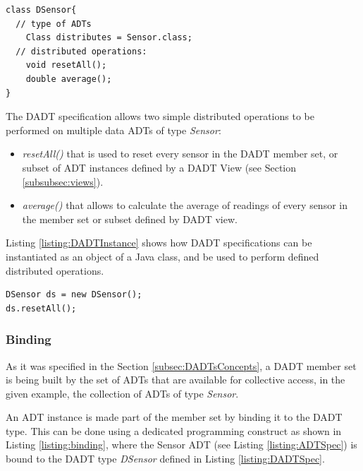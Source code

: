 \begin{lstlisting}[frame=trbl, basewidth={0.55em, 0.6em}, captionpos=b, 
basicstyle=\ttfamily\footnotesize, breaklines, caption = Data DADT 
specification (reproduced from \cite{migliavacca_DADT:2006}), label = 
listing:DADTSpec]
class DSensor{
  // type of ADTs
    Class distributes = Sensor.class;	
  // distributed operations:
	void resetAll();
	double average();
}
\end{lstlisting} 
 
The DADT specification allows two simple distributed operations to be performed
on multiple data ADTs of type \emph{Sensor}:  
\begin{itemize}
\item \emph{resetAll()} that is used to reset every sensor in the DADT member
set, or subset of ADT instances defined by a DADT View (see Section
\ref{subsubsec:views}).
\item \emph{average()} that allows to calculate the average of readings of every
sensor in the member set or subset defined by DADT view.
\end{itemize}

Listing \ref{listing:DADTInstance} shows how DADT specifications can be
instantiated as an object of a Java class, and be used to perform defined
distributed operations.

\begin{lstlisting}[frame=trbl, basewidth={0.55em, 0.6em}, captionpos=b, 
basicstyle=\ttfamily\footnotesize, breaklines, caption = DADT Instantiation 
(adapted from \cite{migliavacca_DADT:2006}), label = listing:DADTInstance ]
DSensor ds = new DSensor();
ds.resetAll();
\end{lstlisting}

\subsubsection{Binding}

As it was specified in the Section \ref{subsec:DADTsConcepts}, a DADT member set
 is being built by the set of ADTs that are available for collective
access, in the given example, the collection of ADTs of type \emph{Sensor}.

An ADT instance is made part of the member set by binding it to the DADT type.
This can be done using a dedicated programming construct as shown in Listing
\ref{listing:binding}, where the Sensor ADT (see Listing \ref{listing:ADTSpec}) is bound to the DADT type \emph{DSensor}
defined in Listing \ref{listing:DADTSpec}.
 
